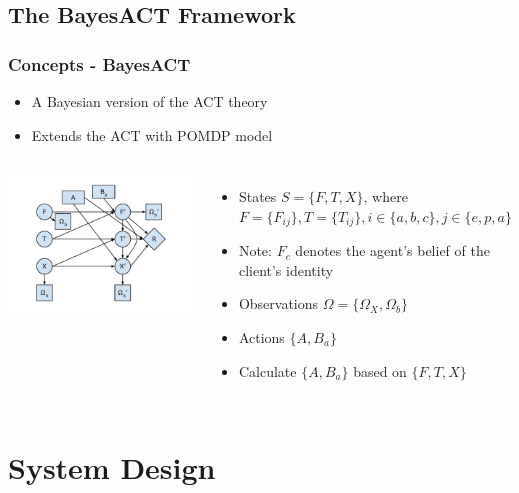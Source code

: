 \documentclass{beamer}
\begin{document}
\subsection{The BayesACT Framework}
\begin{frame}
\frametitle{Concepts - BayesACT}
\begin{itemize}
\item A Bayesian version of the ACT theory
\item Extends the ACT with POMDP model
\end{itemize}
\begin{columns}[c]
\includegraphics[trim = 20mm 10mm 20mm 10mm, clip, width=\linewidth]{fig/fig-bayesact.pdf}
\begin{itemize}
\item States $S = \{F, T, X\}$, where $F = \{F_{ij}\}, T = \{T_{ij}\}, i \in \{a, b, c\}, j \in \{e, p, a\}$
\item Note: $F_{c}$ denotes the agent's belief of the client's identity
\item Observations $\Omega = \{\Omega_{X}, \Omega_{b}\}$
\item Actions $\{A, B_{a}\}$
\item Calculate $\{A, B_{a}\}$ based on $\{F, T, X\}$
\end{itemize}
\end{columns}
\end{frame}


\section{System Design}
\end{document}

